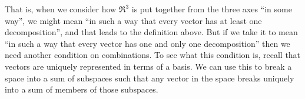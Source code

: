 



That is, when we consider how $\Re^3$ is put together from the three axes
``in some way'', we might mean ``in such a way that every vector 
has at least one decomposition'', and that leads to the definition above.
But if we take it to mean 
``in such a way that every vector has one and only one
decomposition'' then we need another condition on combinations.
To see what this condition is, recall that
vectors are uniquely represented in terms of a basis.
We can use this to break a space into a sum of subspaces
such that any vector in the space breaks uniquely into a sum of members of
those subspaces.

